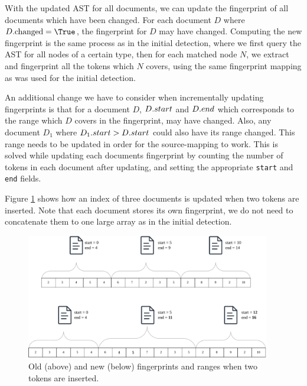 With the updated AST for all documents, we can update the fingerprint of all documents
which have been changed. For each document $D$ where $\Access{D}{\Var{changed}} = \True$,
the fingerprint for $D$ may have changed. Computing the new fingerprint is the same
process as in the initial detection, where we first query the AST for all nodes of a
certain type, then for each matched node $N$, we extract and fingerprint all the tokens
which $N$ covers, using the same fingerprint mapping as was used for the initial
detection.

An additional change we have to consider when incrementally updating fingerprints is that
for a document $D$, ${{D}.{start}}$ and ${{D}.{end}}$ which corresponds to the
range which $D$ covers in the fingerprint, may have changed.  Also, any document $D_1$
where ${{D_1}.{start}} > {{D}.{start}}$ could also have its range changed. This
range needs to be updated in order for the source-mapping to work. This is solved while
updating each documents fingerprint by counting the number of tokens in each document
after updating, and setting the appropriate \verb|start| and \verb|end| fields.

Figure \ref{fig:fingerprintupdate} shows how an index of three documents is updated when
two tokens are inserted. Note that each document stores its own fingerprint, we do not
need to concatenate them to one large array as in the initial detection.

\begin{figure}[t]
    \begin{center}
        \includegraphics[width=0.95\textwidth]{figures/indexupdate.drawio.pdf}
    \end{center}
    \caption{Old (above) and new (below) fingerprints and ranges when two tokens are
    inserted.}
    \label{fig:fingerprintupdate}
\end{figure}

